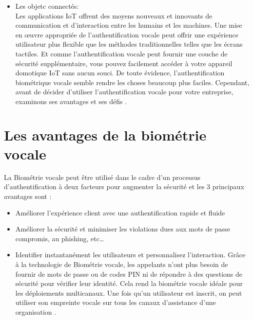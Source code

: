 \begin{itemize}
    \item Les objetc connectés:\\Les applications IoT offrent des moyens nouveaux et innovants de communication et d'interaction entre les humains et les machines.
    Une mise en œuvre appropriée de l'authentification vocale peut offrir une expérience utilisateur plus flexible que les méthodes traditionnelles telles que les écrans tactiles.
    Et comme l'authentification vocale peut fournir une couche de sécurité supplémentaire, vous pouvez facilement accéder à votre appareil domotique IoT sans aucun souci.
    De toute évidence, l'authentification biométrique vocale semble rendre les choses beaucoup plus faciles.
    Cependant, avant de décider d'utiliser l'authentification vocale pour votre entreprise, examinons ses avantages et ses défis \cite{thalesgroup}.
    
\end{itemize}

\section{Les avantages de la biométrie vocale}
La Biométrie vocale peut être utilisé dans le cadre d'un processus d'authentification à deux facteurs pour augmenter la sécurité et les 3 principaux avantages sont :
\begin{itemize}
    \item Améliorer l'expérience client avec une authentification rapide et fluide
    \item Améliorer la sécurité et minimiser les violations dues aux mots de passe compromis, au phishing, etc…
    \item Identifier instantanément les utilisateurs et personnalisez l'interaction. Grâce à la technologie de Biométrie vocale, les appelants n'ont plus besoin de fournir de mots de passe ou de codes PIN ni de répondre à des questions de sécurité pour vérifier leur identité. Cela rend la biométrie vocale idéale pour les déploiements multicanaux. Une fois qu'un utilisateur est inscrit, on peut utiliser son empreinte vocale sur tous les canaux d'assistance d’une organisation \cite{timedoctor}.
\end{itemize}


